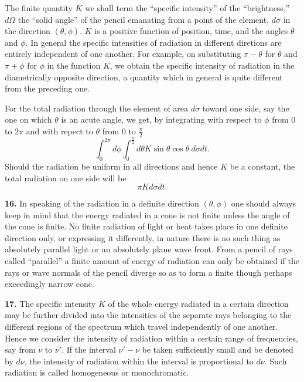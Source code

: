 \documentclass[12pt,oneside]{book}
\begin{document}
The finite quantity $K$ we shall term the ``specific intensity'' of the ``brightness,'' $d\Omega$ the ``solid angle'' of the pencil emanating from a point of the element, $d\sigma$ in the direction $(\theta,\phi)$. $K$ is a positive function of position, time, and the angles $\theta$ and $\phi$. In general the specific intensities of radiation in different diretions are entirely independent of one another. For example, on substituting $\pi - \theta$ for $\theta$ and $\pi + \phi$ for $\phi$ in the function $K$, we obtain the specific intensity of radiation in the diametrically opposite direction, a quantity which in general is quite different from the preceding one. \par

For the total radiation through the element of area $d\sigma$ toward one side, say the one on which $\theta$ is an acute angle, we get, by integrating with respect to $\phi$ from 0 to $2\pi$ and with repect to $\theta$ from 0 to $\frac{\pi}{2}$
$$\int_0^{2\pi}d\phi\int_0^{\frac{\pi}{2}}d\theta K\sin\theta\cos\theta\ d\sigma dt.$$
Should the radiation be uniform in all directions and hence $K$ be a constant, the total radiation on one side will be
\begin{equation}
    \label{eq7}
    \pi Kd\sigma dt.
\end{equation} \par

\textbf{16.} In speaking of the radiation in a definite direction $(\theta,\phi)$ one should always keep in mind that the energy radiated in a cone is not finite unless the angle of the cone is finite. No finite radiation of light or heat takes place in one definite direction only, or expressing it differently, in nature there is no such thing as absolutely parallel light or an absolutely plane wave front. From a pencil of rays called ``parallel'' a finite amount of energy of radiation can only be obtained if the rays or wave normals of the pencil diverge so as to form a finite though perhaps exceedingly narrow cone. \par

\textbf{17.} The specific intensity $K$ of the whole energy radiated in a certain direction may be further divided into the intensities of the separate rays belonging to the different regions of the spectrum which travel independently of one another. Hence we consider the intensity of radiation within a certain range of frequencies, say from $\nu$ to $\nu'$. If the interval $\nu'-\nu$ be taken sufficiently small and be denoted by $d\nu$, the intensity of radiation within the interval is proportional to $d\nu$. Such radiation is called homogeneous or monochromatic. \par
\end{document}
